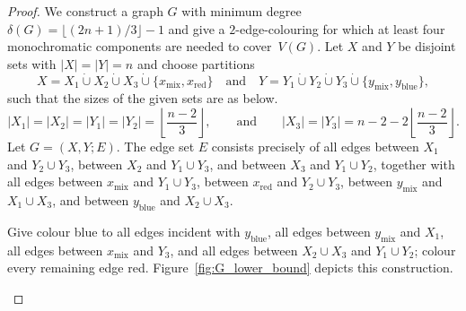 \documentclass[12pt,reqno,a4paper]{amsart}
\newcommand{\blue}{\mathrm{blue}}
\newcommand{\red}{\mathrm{red}}
\newcommand{\mix}{\mathrm{mix}}
\begin{document}
\begin{proof}
We construct a graph $G$ with minimum degree $\delta(G)=\lfloor(2n+1)/3\rfloor
-1$ and give a $2$-edge-colouring for which at least four monochromatic
components are needed to cover~$V(G)$.
Let $X$ and $Y$ be disjoint sets with $|X|=|Y|=n$ and choose partitions
\[
X=X_1\mathbin{\dot\cup}X_2\mathbin{\dot\cup}X_3
  \mathbin{\dot\cup}\{x_{\mix},x_{\red}\}
\quad\text{and}\quad
Y=Y_1\mathbin{\dot\cup}Y_2\mathbin{\dot\cup}Y_3
  \mathbin{\dot\cup}\{y_{\mix},y_{\blue}\},
\]
such that the sizes of the given sets are as below.
\[
|X_1|=|X_2|=|Y_1|=|Y_2|
 =\left\lfloor\frac{n-2}{3}\right\rfloor,
\qquad\text{and}\qquad
|X_3|=|Y_3|
 =n-2-2\left\lfloor\frac{n-2}{3}\right\rfloor.
\]
Let $G=(X,Y;E)$. The edge set $E$ consists precisely of all edges between
$X_1$ and $Y_2\cup Y_3$, between $X_2$ and $Y_1\cup Y_3$, and between $X_3$
and $Y_1\cup Y_2$, together with all edges between $x_{\mix}$ and
$Y_1\cup Y_3$, between $x_{\red}$ and $Y_2\cup Y_3$, between $y_{\mix}$ and
$X_1\cup X_3$, and between $y_{\blue}$ and $X_2\cup X_3$.

Give colour blue to all edges incident with $y_{\blue}$, all edges between
$y_{\mix}$ and $X_1$, all edges between $x_{\mix}$ and $Y_3$, and all edges
between $X_2\cup X_3$ and $Y_1\cup Y_2$; colour every remaining edge red.
Figure~\ref{fig:G_lower_bound} depicts this construction.
\begin{figure}[htbp]
    \centering
\usetikzlibrary{calc}
\end{figure}
\end{proof}
\end{document}
